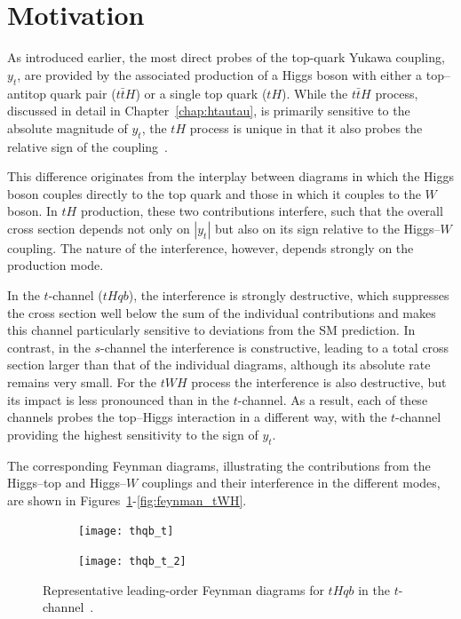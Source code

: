 \section{Motivation}
As introduced earlier, the most direct probes of the top-quark Yukawa coupling, $y_{t}$, are provided by the associated production of a Higgs boson with either a top–antitop quark pair ($t\bar{t}H$) or a single top quark ($tH$). While the $t\bar{t}H$ process, discussed in detail in Chapter~\ref{chap:htautau}, is primarily sensitive to the absolute magnitude of $y_{t}$, the $tH$ process is unique in that it also probes the relative sign of the coupling~\cite{Tait_2000,Barger_2010,Biswas_2013,Farina_2013,Chang_2014}.

This difference originates from the interplay between diagrams in which the Higgs boson couples directly to the top quark and those in which it couples to the $W$ boson. In $tH$ production, these two contributions interfere, such that the overall cross section depends not only on $|y_{t}|$ but also on its sign relative to the Higgs–$W$ coupling. The nature of the interference, however, depends strongly on the production mode.

In the $t$-channel ($tHqb$), the interference is strongly destructive, which suppresses the cross section well below the sum of the individual contributions and makes this channel particularly sensitive to deviations from the SM prediction. In contrast, in the $s$-channel the interference is constructive, leading to a total cross section larger than that of the individual diagrams, although its absolute rate remains very small. For the $tWH$ process the interference is also destructive, but its impact is less pronounced than in the $t$-channel. As a result, each of these channels probes the top–Higgs interaction in a different way, with the $t$-channel providing the highest sensitivity to the sign of $y_t$.

The corresponding Feynman diagrams, illustrating the contributions from the Higgs–top and Higgs–$W$ couplings and their interference in the different modes, are shown in Figures~\ref{fig:feynman_tH_t}-\ref{fig:feynman_tWH}.

\begin{figure}[htbp]
    \centering
    \begin{subfigure}[b]{0.4\textwidth}
      \centering
      \texttt{[image: thqb\_t]}
    \end{subfigure}
    \begin{subfigure}[b]{0.4\textwidth}
      \centering
      \texttt{[image: thqb\_t\_2]}
    \end{subfigure}
    \caption{Representative leading-order Feynman diagrams for $tHqb$ in the $t$-channel~\cite{Barger_2010}.}
    \label{fig:feynman_tH_t}
  \end{figure}


